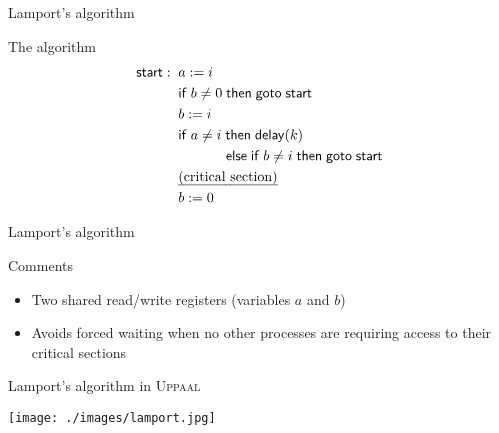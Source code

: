 \documentclass{beamer}
\def\dgold#1{{\darkgoldenrod #1}}
\begin{document}
\begin{slide}{Lamport's algorithm}
\small

\begin{block}{The algorithm}
\begin{align*}
\mathsf{start}: \; \;  &  a := i\\
& \mathsf{if}\; b \neq 0\; \mathsf{then\; goto\; start}\\
& b := i \\
& \mathsf{if}\; a \neq i\; \mathsf{then\; delay}(k)\\
& \hspace{12mm} \mathsf{else} \; \mathsf{if}\; b \neq i\; \mathsf{then\; goto\; start}\\
& \text{\emph{(critical section)}}\\
& b := 0
\end{align*}
\end{block}
\end{slide}

\begin{slide}{Lamport's algorithm}
\small
\begin{block}{Comments}
\begin{itemize}
\item Two shared read/write registers (variables $a$ and $b$)
\item Avoids \dgold{forced waiting} when no other processes are requiring access to their critical sections
\end{itemize}
\end{block}
\end{slide}


\begin{slide}{Lamport's algorithm in \textsc{Uppaal}}
\small

\begin{center}
\texttt{[image: ./images/lamport.jpg]} 
\end{center}


\end{slide}
\end{document}
